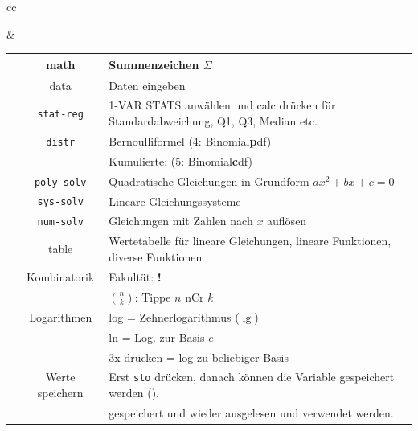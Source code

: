 \begin{tabular}{cc}


&

\begin{tabular}{c|c|p{80mm}}\hline
\tiprobutton{math}         &math              & Summenzeichen $\Sigma$ \\\hline
\tiprobutton{data}         &data              & Daten eingeben\\
                           &\texttt{stat-reg} & 1-VAR STATS anwählen und calc drücken für Standardabweichung, Q1, Q3, Median etc.\\
                           &\texttt{distr}    & Bernoulliformel (4: Binomial\textbf{p}df)\\
                           &                  & Kumulierte: (5: Binomial\textbf{c}df)\\\hline
\tiprobutton{cos_poly-solv}&\texttt{poly-solv}&  Quadratische Gleichungen in Grundform $ax^2+bx+c=0$\\\hline
\tiprobutton{tan_sys-solv} &\texttt{sys-solv} &  Lineare Gleichungssysteme\\\hline
\tiprobutton{sin_num-solv} &\texttt{num-solv} &  Gleichungen mit Zahlen nach $x$ auf\/lösen\\\hline
\tiprobutton{table}        & table            &  Wertetabelle für lineare Gleichungen, lineare Funktionen, diverse Funktionen\\\hline
\tiprobutton{ncrnpr}       &Kombinatorik      &  Fakultät: {\color{red}\textbf{!}}\\
                           &                  &  $n \choose k$: Tippe $n$ nCr $k$\\\hline
\tiprobutton{ln_log}       &  Logarithmen     &  log = Zehnerlogarithmus ($\lg$)\\
                           &                  &  ln  = Log. zur Basis $e$\\
                           &                  &  3x drücken = log zu beliebiger Basis\\\hline
\tiprobutton{sto_recall}   & Werte speichern  &  Erst \texttt{sto} drücken, danach können die Variable gespeichert werden (\tiprobutton{xyzabcd}). \\\hline
\tiprobutton{xyzabcd}      &                  & gespeichert und wieder ausgelesen und verwendet werden.
\end{tabular}
\end{tabular}


